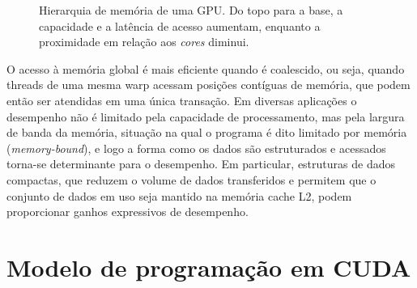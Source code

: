 \documentclass[
	12pt,				%
	openright,			%
	oneside,			%
	a4paper,			%
	english,			%
	french,				%
	spanish,			%
	brazil				%
	]{abntex2}
\begin{document}
\begin{figure}[H]
\centering
{}
\caption{Hierarquia de memória de uma GPU. Do topo para a base, a capacidade e a latência de acesso aumentam, enquanto a proximidade em relação aos \textit{cores} diminui.}
\label{fig:memoria}
\end{figure}

O acesso à memória global é mais eficiente quando é coalescido, ou seja, quando threads de uma mesma warp acessam posições contíguas de memória, que podem então ser atendidas em uma única transação. Em diversas aplicações o desempenho não é limitado pela capacidade de processamento, mas pela largura de banda da memória, situação na qual o programa é dito limitado por memória (\textit{memory-bound}), e logo a forma como os dados são estruturados e acessados torna-se determinante para o desempenho. Em particular, estruturas de dados compactas, que reduzem o volume de dados transferidos e permitem que o conjunto de dados em uso seja mantido na memória cache L2, podem proporcionar ganhos expressivos de desempenho.

\section{Modelo de programação em CUDA}
\end{document}

